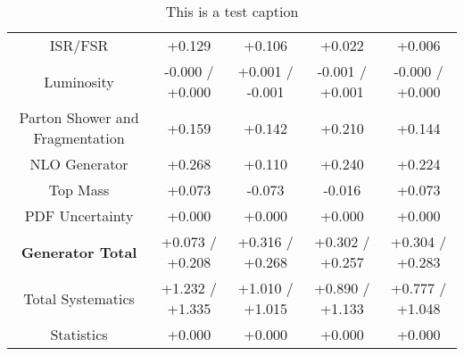 \begin{table}[htbp]
\begin{center}
\begin{tabular}{|c|c|c|c|c|}
ISR/FSR                               &+0.129              & +0.106              & +0.022              & +0.006             \\
Luminosity                            &-0.000   / +0.000   & +0.001   / -0.001   & -0.001   / +0.001   & -0.000   / +0.000  \\
Parton Shower and Fragmentation       &+0.159              & +0.142              & +0.210              & +0.144             \\
NLO Generator                         &+0.268              & +0.110              & +0.240              & +0.224             \\
Top Mass                              &+0.073              & -0.073              & -0.016              & +0.073             \\
PDF Uncertainty                       &+0.000              & +0.000              & +0.000              & +0.000             \\
\hline
\textbf{Generator Total}              &+0.073   / +0.208   & +0.316   / +0.268   & +0.302   / +0.257   & +0.304   / +0.283  \\
\hline
\hline
Total Systematics                     &+1.232   / +1.335   & +1.010   / +1.015   & +0.890   / +1.133   & +0.777   / +1.048  \\
Statistics                            &+0.000              & +0.000              & +0.000              & +0.000             \\
\hline
  \end{tabular}
  \end{center} 
  \label{tab:fsm_nominal_rratio_high}
  \caption{This is a test caption}
\end{table}


 

